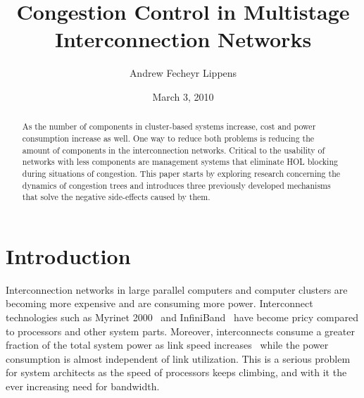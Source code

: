 


\title{Congestion Control in Multistage Interconnection Networks}
\author{Andrew Fecheyr Lippens}
\date{March 3, 2010}





\begin{abstract}
As the number of components in cluster-based systems increase, cost and power consumption increase as well. One way to reduce both problems is reducing the amount of components in the interconnection networks. Critical to the usability of networks with less components are management systems that eliminate HOL blocking during situations of congestion. This paper starts by exploring research concerning the dynamics of congestion trees and introduces three previously developed mechanisms that solve the negative side-effects caused by them.
\end{abstract}

\setcounter{tocdepth}{2}

\begin{tableofcontents}
\end{tableofcontents}

\newpage

\addtolength{\parskip}{0.5\baselineskip}

\section{Introduction}\label{C:intro}
Interconnection networks in large parallel computers and computer clusters are becoming more expensive and are consuming more power. Interconnect technologies such as Myrinet 2000~\cite{myrinet} and InfiniBand~\cite{infiniband} have become pricy compared to processors and other system parts. Moreover, interconnects consume a greater fraction of the total system power as link speed increases~\cite{SPJ03} while the power consumption is almost independent of link utilization. This is a serious problem for system architects as the speed of processors keeps climbing, and with it the ever increasing need for bandwidth.

